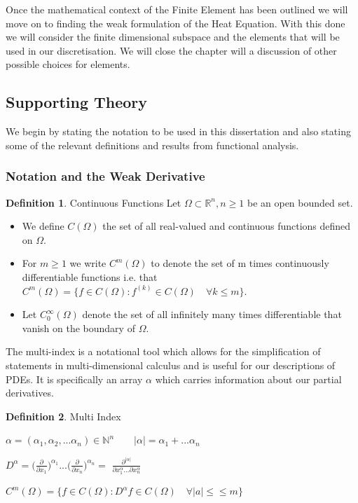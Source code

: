 \documentclass{uonmathreport}
\theoremstyle{definition}
\newtheorem{definition}{Definition}[section]
\theoremstyle{problem}
\theoremstyle{theorem}
\begin{document}
Once the mathematical context of the Finite Element has been outlined we will move on to finding the weak formulation of the Heat Equation. With this done we will consider the finite dimensional subspace and the elements that will be used in our discretisation. We will close the chapter will a discussion of other possible choices for elements.

\subsection{Supporting Theory} \label{subsec:Sobolev}

We begin by stating the notation to be used in this dissertation and also stating some of the relevant definitions and results from functional analysis.

\subsubsection{Notation and the Weak Derivative} \label{subsec:Function Spaces}

\begin{definition}{Continuous Functions}
Let $\Omega \subset \mathbb{R}^n , n \geq 1$ be an open bounded set. 
\begin{itemize}
\item We define $C(\Omega)$  the set of all real-valued and continuous functions defined on $\Omega$.
\item For $m \geq1$ we write $C^m(\Omega)$ to denote the set of m times continuously differentiable functions  i.e. that $C^m(\Omega) = \{f \in C(\Omega) : f^{(k)} \in C(\Omega)\quad \forall k \leq m\} $.
\item Let $C^{\infty}_0(\Omega) $ denote the set of all infinitely many times differentiable that vanish on the boundary of $\Omega$.
\end{itemize}
\end{definition}

The multi-index is a notational tool which allows for the simplification of statements in multi-dimensional calculus and is useful for our descriptions of PDEs. It is specifically an array $\alpha$ which carries information about our partial derivatives.

\begin{definition}{Multi Index}

$\alpha = (\alpha_1, \alpha_2, ... \alpha_n) \in \mathbb{N}^n \quad \quad   |\alpha| = \alpha_1 + ... \alpha_n$

$D^{\alpha} = \Big(\frac{\partial}{\partial x_1}\Big)^{\alpha_1}...\Big(\frac{\partial}{\partial x_n}\Big)^{\alpha_n} = $
$\frac{\partial^{|\alpha|}}{\partial x^{\alpha}_1 ... \partial x^{\alpha}_n}$


$C^m(\Omega) = \{f \in C(\Omega) : D^\alpha f \in C(\Omega)\quad \forall |a| \leq\leq m\} $

\end{definition}
\end{document}
